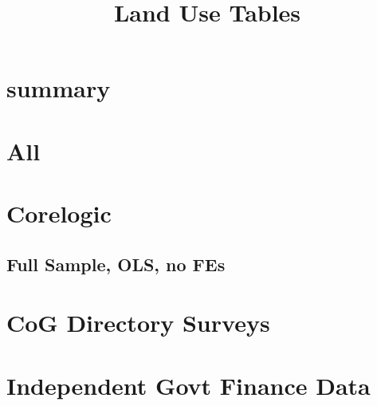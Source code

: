 \documentclass{article}
\title{Land Use Tables}
\begin{document}
\maketitle
\tableofcontents
{\footnotesize 
\listoffigures
\listoftables}
\clearpage


\section{summary}

\begin{table}[htbp]
\footnotesize
\centering {} 

 \label{tab:muni_outcomes_rf}
 \end{table}
\begin{landscape}

\section{All}

\clearpage

\clearpage


\clearpage

\clearpage


\section{Corelogic}
\subsection{Full Sample, OLS, no FEs}

\clearpage

\clearpage

\section{CoG Directory Surveys}

\clearpage

\clearpage

\section{Independent Govt Finance Data}

\clearpage

\clearpage

\end{landscape}
\end{document}
